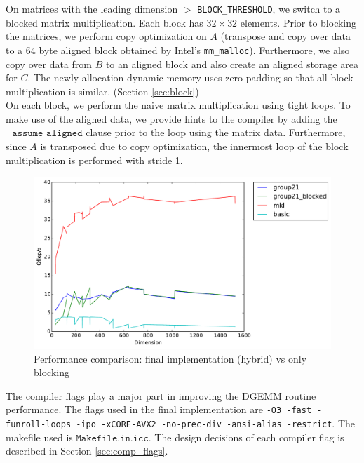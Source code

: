 \documentclass[11pt]{article}
\begin{document}
On matrices with the leading dimension $>$ \texttt{BLOCK\_THRESHOLD}, we switch to a blocked matrix multiplication. Each block has $32 \times 32$ elements. Prior to blocking the matrices, we perform copy optimization on $A$ (transpose and copy over data to a 64 byte aligned block obtained by Intel's \texttt{mm\_malloc}). Furthermore, we also copy over data from $B$ to an aligned block and also create an aligned storage area for $C$. The newly allocation dynamic memory uses zero padding so that all block multiplication is similar. (Section \ref{sec:block}) \\

On each block, we perform the naive matrix multiplication using tight loops. To make use of the aligned data, we provide hints to the compiler by adding the $\texttt{\_\_assume\_aligned}$ clause prior to the loop using the matrix data. \cite{vectorization} Furthermore, since $A$ is transposed due to copy optimization, the innermost loop of the block multiplication is performed with stride 1. \\

\begin{figure}[H]
\centering
\includegraphics[scale=0.6]{pure_vs_hybrid.pdf}
\caption{Performance comparison: final implementation (hybrid) vs only blocking}
\end{figure}

The compiler flags play a major part in improving the DGEMM routine performance. The flags used in the final implementation are \texttt{-O3 -fast -funroll-loops -ipo -xCORE-AVX2 -no-prec-div -ansi-alias -restrict}. The makefile used is $\texttt{Makefile.in.icc}$. The design decisions of each compiler flag is described in Section \ref{sec:comp_flags}.
\end{document}
